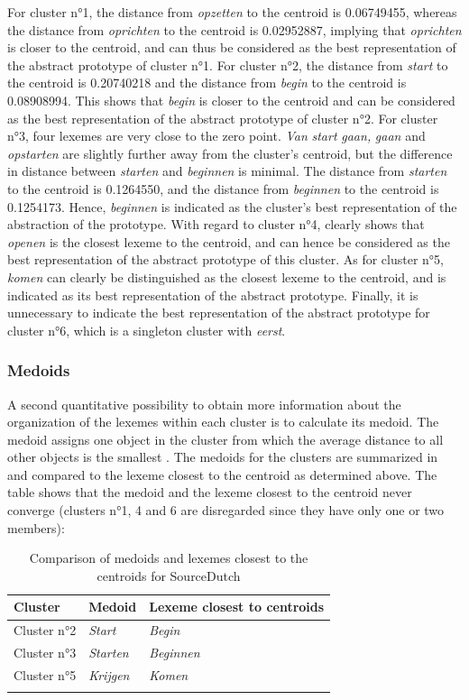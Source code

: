 For cluster n°1, the distance from \textit{opzetten} to the centroid is 0.06749455, whereas the distance from \textit{oprichten} to the centroid is 0.02952887, implying that \textit{oprichten} is closer to the centroid, and can thus be considered as the best representation of the abstract prototype of cluster n°1. For cluster n°2, the distance from \textit{start} to the centroid is 0.20740218 and the distance from \textit{begin} to the centroid is 0.08908994. This shows that \textit{begin} is closer to the centroid and can be considered as the best representation of the abstract prototype of cluster n°2. For cluster n°3, four lexemes are very close to the zero point. \textit{Van} \textit{start} \textit{gaan,} \textit{gaan} and \textit{opstarten} are slightly further away from the cluster’s centroid, but the difference in distance between \textit{starten} and \textit{beginnen} is minimal. The distance from \textit{starten} to the centroid is 0.1264550, and the distance from \textit{beginnen} to the centroid is 0.1254173. Hence, \textit{beginnen} is indicated as the cluster’s best representation of the abstraction of the prototype. With regard to cluster n°4,  clearly shows that \textit{openen} is the closest lexeme to the centroid, and can hence be considered as the best representation of the abstract prototype of this cluster. As for cluster n°5, \textit{komen} can clearly be distinguished as the closest lexeme to the centroid, and is indicated as its best representation of the abstract prototype. Finally, it is unnecessary to indicate the best representation of the abstract prototype for cluster n°6, which is a singleton cluster with \textit{eerst}.

\subsubsection{Medoids}
\label{sec:4.2.3.2}  
A second quantitative possibility to obtain more information about the organization of the lexemes within each cluster is to calculate its medoid. The medoid assigns one object in the cluster from which the average distance to all other objects is the smallest \citep[164]{divjak_structuring_2010}. The medoids for the clusters are summarized in  and compared to the lexeme closest to the centroid as determined above. The table shows that the medoid and the lexeme closest to the centroid never converge (clusters n°1, 4 and 6 are disregarded since they have only one or two members):

\begin{table}
\caption{\label{tab:4:14}Comparison of medoids and lexemes closest to the centroids for SourceDutch}
\begin{tabularx}{\textwidth}{XXl} 
\lsptoprule
Cluster & Medoid & Lexeme closest to centroids\\
\midrule
Cluster n°2 & \itshape Start   & \itshape Begin\\
Cluster n°3 & \itshape Starten & \itshape Beginnen\\
Cluster n°5 & \itshape Krijgen & \itshape Komen\\
\lspbottomrule
\end{tabularx}
\end{table}

